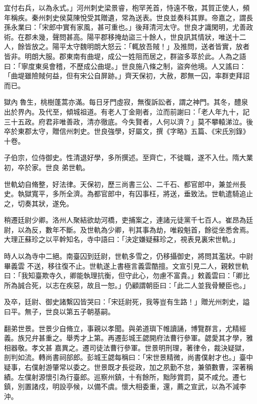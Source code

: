 \begin{pinyinscope}
 宜付右兵，以為永式。」河州刺史梁景睿，枹罕羌首，恃遠不敬，其賀正使人，頻年稱疾。秦州刺史侯莫陳悅受其贈遺，常為送表。世良並奏科其罪。帝嘉之，謂長孫永業曰：「宋郎中實有家風，甚可重也。」後拜清河太守。世良才識閑明，尤善政術。在郡未幾，聲問甚高。陽平郡移掩劫盜三十餘人，世良訊其情狀，唯送十二人，餘皆放之。陽平太守魏明朗大怒云：「輒放吾賊！」及推問，送者皆實，放者皆非。明朗大服。郡東南有曲堤，成公一姓阻而居之，群盜多萃於此。人為之語
 曰：「寧度東吳會稽，不歷成公曲堤。」世良施八條之制，盜奔他境。人又謠曰：「曲堤雖險賊何益，但有宋公自屏跡。」齊天保初，大赦，郡無一囚，率群吏拜詔而已。



 獄內魯生，桃樹蓬蒿亦滿。每日牙門虛寂，無復訴訟者，謂之神門。其冬，醴泉出於界內。及代至，傾城祖道。有老人丁金剛者，泣而前謝曰：「老人年九十，記三十五政。府君非唯善政，清亦徹底。今失賢者，人何以濟？」莫不攀轅涕泣。後卒於東郡太守，贈信州刺史。世良強學，好屬文，撰《字略》五篇、《宋氏別錄》十卷。



 子伯宗，位侍御史。性清退好學，多所撰述。至齊亡，不徙職，遂不入仕。隋大業初，卒於家。世良
 弟世軌。



 世軌幼自脩整，好法律。天保初，歷三尚書三公、二千石、都官郎中，兼並州長史。執獄寬平，多所全濟。為都官郎中，有囚事枉，將送，垂致法。世軌遣騎追止之，切奏其狀，遂免。



 稍遷廷尉少卿。洛州人聚結欲劫河橋，吏捕案之，連諸元徒黨千七百人。崔昂為廷尉，以為反，數年不斷。及世軌為少卿，判其事為劫，唯殺魁首，餘從坐悉舍焉。大理正蘇珍之以平幹知名，寺中語曰：「決定嫌疑蘇珍之，視表見裏宋世軌。」



 時人以為寺中二絕。南臺囚到廷尉，世軌多雪之，仍移攝御史，將問其濫狀。中尉畢義雲
 不送，移往復不止。世軌遂上書極言義雲酷擅。文宣引見二人，親敕世軌曰：「我知臺欺寺久，卿能執理抗衡，但守此心，勿慮不富貴。」敕義雲曰：「卿比所為誠合死，以志在疾惡，故且一恕。」仍顧謂朝臣曰：「此二人並我骨鯁臣也。」



 及卒，廷尉、御史諸繫囚皆哭曰：「宋廷尉死，我等豈有生路！」贈光州刺史，謚曰平。無子，世良以第五子朝基嗣。



 翻弟世景。世景少自脩立，事親以孝聞。與弟道璵下帷讀誦，博覽群言，尤精經義。族兄弁甚重之。舉秀才上第。再遷彭城王勰開府法曹行參軍。勰愛其才學，雅相器敬。孝文甚
 嘉異之。遷司徒法曹行參軍。世景明刑理，著律令，裁決疑獄，剖判如流。轉尚書祠部郎。彭城王勰每稱曰：「宋世景精微，尚書僕射才也。」臺中疑事，右僕射游肇常以委之。世景既才長從政，加之夙勤不怠，兼領數曹，深著稱績。左僕射源懷引為行臺郎。巡察州鎮，十有餘所，黜陟賞罰，莫不咸允。遷七鎮，別置諸戍，明設亭候，以備不虞。懷大相委重，還，薦之宣武，以為不減李沖。




\end{pinyinscope}
